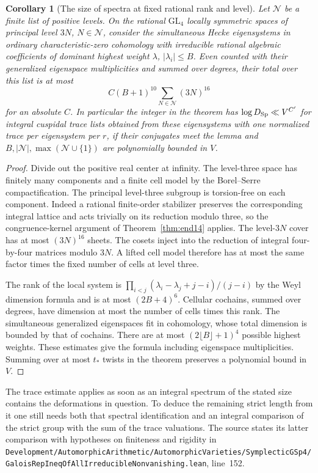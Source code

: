 \documentclass[a4paper,11pt]{article}
\newtheorem{corollary}[proposition]{Corollary}
\theoremstyle{definition}
\theoremstyle{remark}
\newcommand{\srcloc}[2]{{\small\nolinkurl{#1.lean}}, line~#2}
\numberwithin{equation}{section}
\begin{document}
\begin{corollary}[The size of spectra at fixed rational rank and level]\leavevmode
\label{cor:fixedlevelcount433}
Let \(\mathcal N\) be a finite list of positive levels. On the
rational \(\mathrm{GL}_4\) locally symmetric spaces of principal
level \(3N\), \(N\in\mathcal N\), consider the simultaneous
Hecke eigensystems in ordinary characteristic-zero cohomology
with irreducible rational algebraic coefficients of dominant
highest weight \(\lambda\), \(|\lambda_i|\le B\).
Even counted with their generalized eigenspace multiplicities
and summed over degrees, their total over this list is at most
\[
               C(B+1)^{10}\sum_{N\in\mathcal N}(3N)^{16}
\]
for an absolute \(C\). In particular the integer in the theorem
has \(\log D_{\rm Sp}\ll V^{C'}\) for integral cuspidal trace
lists obtained from these eigensystems with one normalized
trace per eigensystem per \(r\), if their conjugates meet the
lemma and \(B,|\mathcal N|,\max(\mathcal N\cup\{1\})\) are
polynomially bounded in \(V\).
\end{corollary}
\begin{proof}
Divide out the positive real center at infinity. The level-three
space has finitely many components and a finite cell model by
the Borel--Serre compactification. The principal level-three
subgroup is torsion-free on each component. Indeed a rational
finite-order stabilizer preserves the corresponding integral
lattice and acts trivially on its reduction modulo three, so
the congruence-kernel argument of Theorem~\ref{thm:end14}
applies. The level-\(3N\) cover has at most \((3N)^{16}\)
sheets. The cosets inject into the reduction of integral
four-by-four matrices modulo \(3N\). A lifted cell model
therefore has at most the same factor times the fixed number
of cells at level three.~\cite{IX-VII-V-bs}

The rank of the local system is
\(\prod_{i<j}(\lambda_i-\lambda_j+j-i)/(j-i)\) by the Weyl
dimension formula and is at most \((2B+4)^6\).
Cellular cochains, summed over degrees, have dimension at
most the number of cells times this rank. The simultaneous
generalized eigenspaces fit in cohomology, whose total
dimension is bounded by that of cochains. There are at most
\((2\lfloor B\rfloor+1)^4\) possible highest weights. These
estimates give the formula including eigenspace multiplicities.
Summing over at most \(t_*\) twists in the theorem preserves
a polynomial bound in \(V\).
\end{proof}

The trace estimate applies as soon as an integral spectrum of
the stated size contains the deformations in question. To
deduce the remaining strict length from it one still needs
both that spectral identification and an integral comparison
of the strict group with the sum of the trace valuations.
The source states its latter comparison with hypotheses on
finiteness and rigidity in
\srcloc{Development/AutomorphicArithmetic/AutomorphicVarieties/SymplecticGSp4/GaloisRepIneqOfAllIrreducibleNonvanishing}{152}.
\end{document}
